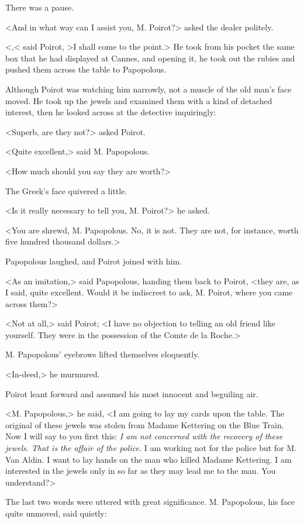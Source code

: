 There was a pause.

<And in what way can I assist you, M. Poirot?> asked the dealer politely.

<,< said Poirot, >I shall come to the point.> He took from his pocket the same box that he had displayed at Cannes, and opening it, he took out the rubies and pushed them across the table to Papopolous.

Although Poirot was watching him narrowly, not a muscle of the old man's face moved. He took up the jewels and examined them with a kind of detached interest, then he looked across at the detective inquiringly:

<Superb, are they not?> asked Poirot.

<Quite excellent,> said M. Papopolous.

<How much should you say they are worth?>

The Greek's face quivered a little.

<Is it really necessary to tell you, M. Poirot?> he asked.

<You are shrewd, M. Papopolous. No, it is not. They are not, for instance, worth five hundred thousand dollars.>

Papopolous laughed, and Poirot joined with him.

<As an imitation,> said Papopolous, handing them back to Poirot, <they are, as I said, quite excellent. Would it be indiscreet to ask, M. Poirot, where you came across them?>

<Not at all,> said Poirot; <I have no objection to telling an old friend like yourself. They were in the possession of the Comte de la Roche.>

M. Papopolous' eyebrows lifted themselves eloquently.

<In-deed,> he murmured.

Poirot leant forward and assumed his most innocent and beguiling air.

<M. Papopolous,> he said, <I am going to lay my cards upon the table. The original of these jewels was stolen from Madame Kettering on the Blue Train. Now I will say to you first this: \emph{I am not concerned with the recovery of these jewels. That is the affair of the police.} I am working not for the police but for M. Van Aldin. I want to lay hands on the man who killed Madame Kettering. I am interested in the jewels only in so far as they may lead me to the man. You understand?>

The last two words were uttered with great significance. M. Papopolous, his face quite unmoved, said quietly:

